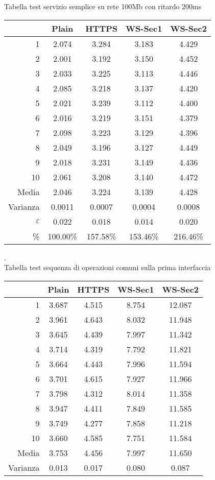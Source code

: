Tabella test servizio semplice su rete 100Mb con ritardo 200ms \\

\begin{small}\begin{longtable}{|r|c|c|c|c|}
\hline\hline
&Plain&HTTPS&WS-Sec1&WS-Sec2\\
\hline\hline
1&2.074&3.284&3.183&4.429\\
\hline
2&2.001&3.192&3.150&4.452\\
\hline
3&2.033&3.225&3.113&4.446\\
\hline
4&2.085&3.218&3.137&4.420\\
\hline
5&2.021&3.239&3.112&4.400\\
\hline
6&2.016&3.219&3.151&4.379\\
\hline
7&2.098&3.223&3.129&4.396\\
\hline
8&2.049&3.196&3.127&4.449\\
\hline
9&2.018&3.231&3.149&4.436\\
\hline
10&2.061&3.208&3.140&4.472\\
\hline\hline
Media&2.046&3.224&3.139&4.428\\
\hline
Varianza&0.0011&0.0007&0.0004&0.0008\\
\hline
$\varepsilon$&0.022&0.018&0.014&0.020\\
\hline
\%&100.00\%&157.58\%&153.46\%&216.46\%\\
\hline\hline
\end{longtable}\end{small}

.\\

Tabella test sequenza di operazioni comuni sulla prima interfaccia\\

\begin{small}\begin{longtable}{|r|c|c|c|c|}
\hline\hline
&Plain&HTTPS&WS-Sec1&WS-Sec2\\
\hline\hline
1&3.687&4.515&8.754&12.087\\
\hline
2&3.961&4.643&8.032&11.948\\
\hline
3&3.645&4.439&7.997&11.342\\
\hline
4&3.714&4.319&7.792&11.821\\
\hline
5&3.664&4.443&7.996&11.594\\
\hline
6&3.701&4.615&7.927&11.966\\
\hline
7&3.798&4.312&8.014&11.358\\
\hline
8&3.947&4.411&7.849&11.585\\
\hline
9&3.749&4.277&7.858&11.218\\
\hline
10&3.660&4.585&7.751&11.584\\
\hline\hline
Media&3.753&4.456&7.997&11.650\\
\hline
Varianza&0.013&0.017&0.080&0.087\\
\hline\hline
\end{longtable}\end{small}

